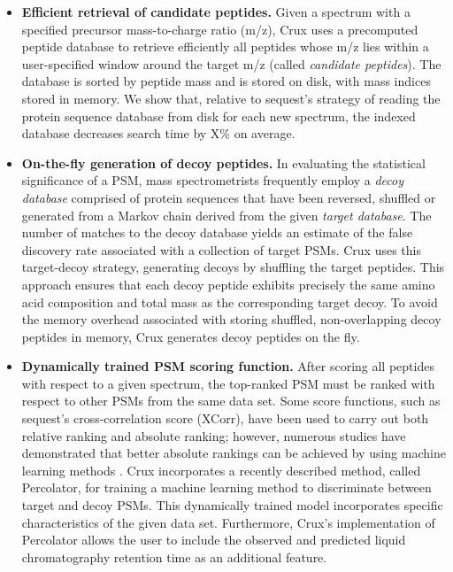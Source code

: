 \documentclass[12pt]{article}
\begin{document}
\begin{itemize}

\item {\bf Efficient retrieval of candidate peptides.}  Given a
  spectrum with a specified precursor mass-to-charge ratio (m/z), Crux
  uses a precomputed peptide database to retrieve efficiently all
  peptides whose m/z lies within a user-specified window around the
  target m/z (called {\em candidate peptides}).  The database is
  sorted by peptide mass and is stored on disk, with mass indices
  stored in memory.  We show that, relative to {\sc sequest}'s strategy of
  reading the protein sequence database from disk for each new
  spectrum, the indexed database decreases search time by X\% on
  average.

\item {\bf On-the-fly generation of decoy peptides.}  In evaluating
  the statistical significance of a PSM, mass spectrometrists
  frequently employ a {\em decoy database} comprised of protein
  sequences that have been reversed, shuffled or generated from a
  Markov chain derived from the given {\em target database}.  The
  number of matches to the decoy database yields an estimate of the
  false discovery rate associated with a collection of target PSMs.
  Crux uses this target-decoy strategy, generating decoys by shuffling
  the target peptides.  This approach ensures that each decoy peptide
  exhibits precisely the same amino acid composition and total mass as
  the corresponding target decoy.  To avoid the memory overhead
  associated with storing shuffled, non-overlapping decoy peptides in
  memory, Crux generates decoy peptides on the fly.

\item {\bf Dynamically trained PSM scoring function.}  After scoring
  all peptides with respect to a given spectrum, the top-ranked PSM
  must be ranked with respect to other PSMs from the same data set.
  Some score functions, such as {\sc sequest}'s cross-correlation score
  (XCorr), have been used to carry out both relative ranking and
  absolute ranking; however, numerous studies have demonstrated that
  better absolute rankings can be achieved by using machine learning
  methods \cite{keller:empirical, anderson:new, elias:intensity,
  kall:semi-supervised}.  Crux incorporates a recently described
  method, called Percolator, for training a machine learning method to
  discriminate between target and decoy PSMs.  This dynamically
  trained model incorporates specific characteristics of the given
  data set.  Furthermore, Crux's implementation of Percolator allows
  the user to include the observed and predicted liquid chromatography
  retention time \cite{klammer:peptide2} as an additional feature.


\end{itemize}
\end{document}
